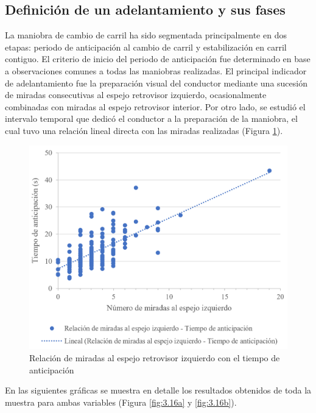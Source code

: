 \subsection{Definición de un adelantamiento y sus fases}\label{321}

La maniobra de cambio de carril ha sido segmentada principalmente en dos etapas: periodo de anticipación al cambio de carril y estabilización en carril contiguo. El criterio de inicio del periodo de anticipación fue determinado en base a observaciones comunes a todas las maniobras realizadas. El principal indicador de adelantamiento fue la preparación visual del conductor mediante una sucesión de miradas consecutivas al espejo retrovisor izquierdo, ocasionalmente combinadas con miradas al espejo retrovisor interior. Por otro lado, se estudió el intervalo temporal que dedicó el conductor a la preparación de la maniobra, el cual tuvo una relación lineal directa con las miradas realizadas (Figura \ref{fig:3.15}). 

\begin{figure}[h]
    \centering
    \includegraphics[width=12.5cm]
    {figures/3.15.png}
    \caption{ \label{fig:3.15} Relación de miradas al espejo retrovisor izquierdo con el tiempo de anticipación }
\end{figure}

En las siguientes gráficas se muestra en detalle los resultados obtenidos de toda la muestra para ambas variables (Figura \ref{fig:3.16a} y \ref{fig:3.16b}).

